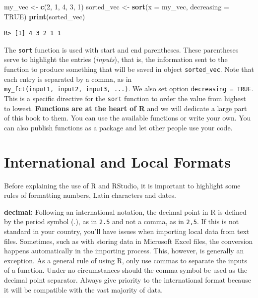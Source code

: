 \documentclass[
  12pt,
]{book}
\newenvironment{Shaded}{\begin{snugshade}}{\end{snugshade}}
\newcommand{\DataTypeTok}[1]{\textcolor[rgb]{0.27,0.27,0.27}{#1}}
\newcommand{\DecValTok}[1]{\textcolor[rgb]{0.06,0.06,0.06}{#1}}
\newcommand{\KeywordTok}[1]{\textcolor[rgb]{0.27,0.27,0.27}{\textbf{#1}}}
\newcommand{\NormalTok}[1]{#1}
\newcommand{\OtherTok}[1]{\textcolor[rgb]{0.37,0.37,0.37}{#1}}
\newcommand{\StringTok}[1]{\textcolor[rgb]{0.5,0.5,0.5}{#1}}
\begin{document}
\begin{Shaded}
\begin{Highlighting}[]
\NormalTok{my_vec <-}\StringTok{ }\KeywordTok{c}\NormalTok{(}\DecValTok{2}\NormalTok{, }\DecValTok{1}\NormalTok{, }\DecValTok{4}\NormalTok{, }\DecValTok{3}\NormalTok{, }\DecValTok{1}\NormalTok{)}
\NormalTok{sorted_vec <-}\StringTok{ }\KeywordTok{sort}\NormalTok{(}\DataTypeTok{x =}\NormalTok{ my_vec, }\DataTypeTok{decreasing =} \OtherTok{TRUE}\NormalTok{)}
\KeywordTok{print}\NormalTok{(sorted_vec)}
\end{Highlighting}
\end{Shaded}

\begin{verbatim}
R> [1] 4 3 2 1 1
\end{verbatim}

The \texttt{sort} function is used with start and end parentheses. These parentheses serve to highlight the entries (\emph{inputs}), that is, the information sent to the function to produce something that will be saved in object \texttt{sorted\_vec}. Note that each entry is separated by a comma, as in \texttt{my\_fct(input1,\ input2,\ input3,\ ...)}. We also set option \texttt{decreasing\ =\ TRUE}. This is a specific directive for the \texttt{sort} function to order the value from highest to lowest. \textbf{Functions are at the heart of R} and we will dedicate a large part of this book to them. You can use the available functions or write your own. You can also publish functions as a package and let other people use your code.

\hypertarget{international-and-local-formats}{%
\section{International and Local Formats}\label{international-and-local-formats}}

Before explaining the use of R and RStudio, it is important to highlight some rules of formatting numbers, Latin characters and dates.

\textbf{decimal:} Following an international notation, the decimal point in R is defined by the period symbol (.), as in \texttt{2.5} and not a comma, as in \texttt{2,5}. If this is not standard in your country, you'll have issues when importing local data from text files. Sometimes, such as with storing data in Microsoft Excel files, the conversion happens automatically in the importing process. This, however, is generally an exception. As a general rule of using R, only use commas to separate the inputs of a function. Under no circumstances should the comma symbol be used as the decimal point separator. Always give priority to the international format because it will be compatible with the vast majority of data. 
\end{document}
